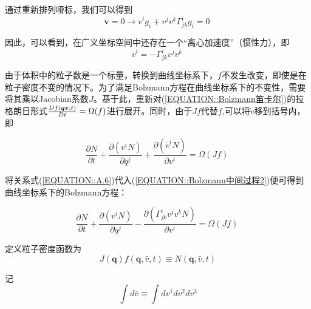 \documentclass[LBMDerivation.tex]{subfiles}
\begin{document}
通过重新排列哑标，我们可以得到
\begin{equation}
  \dot{\boldsymbol{v}}=0 \rightarrow \dot{v}^{i} g_{i}+v^{j} v^{k} \Gamma_{j k}^{i} g_{i}=0
  \label{EQUATION::A.5} ~
\end{equation}
%
%

因此，可以看到，在广义坐标空间中还存在一个“离心加速度”（惯性力），即
%
%
\begin{equation}
  \dot{v}^{i}=- \Gamma_{j k}^{i}v^{j} v^{k}
  \label{EQUATION::A.6} ~
\end{equation}

由于体积中的粒子数是一个标量，转换到曲线坐标系下，$f$不发生改变，即使是在粒子密度不变的情况下。为了满足Bolzmann方程在曲线坐标系下的不变性，需要将其乘以Jacobian系数$J$。基于此，重新对(\ref{EQUATION::Bolzmann笛卡尔})的拉格朗日形式${D f(\boldsymbol{q}\boldsymbol{v}, t) \over Dt} =\Omega(f)$进行展开。同时，由于$Jf$代替$f$,可以将$\dot{v}$移到括号内，即


\begin{equation}
  \frac{\partial N}{\partial t}+\frac{\partial (v^i N)}{\partial q^{j}} +  \frac{\partial (\dot{v}^{i} N)}{\partial  v^{i}} =\Omega(Jf)
  \label{EQUATION::Bolzmann中间过程2} ~
\end{equation}

%
%

%

将关系式(\ref{EQUATION::A.6})代入(\ref{EQUATION::Bolzmann中间过程2})便可得到曲线坐标系下的Bolzmann方程：

\begin{equation}
  \boxed{
    \frac{\partial N}{\partial t}+\frac{\partial (v^i N)}{\partial q^{j}} -  \frac{\partial ( \Gamma_{j k}^{i} v^{j} v^{k}  N)}{\partial  v^i } =\Omega(Jf)
  }
  \label{EQUATION::Bolzamman 曲线} ~
\end{equation}







定义粒子密度函数为
\begin{equation}
  J(\boldsymbol{q}) f(\boldsymbol{q}, \bar{v}, t) \equiv N(\boldsymbol{q}, \bar{v}, t)
\end{equation}

记
\begin{equation}
  \int d \bar{v} \equiv \int d v^{1} d v^{2} d v^{3}
\end{equation}
\end{document}
